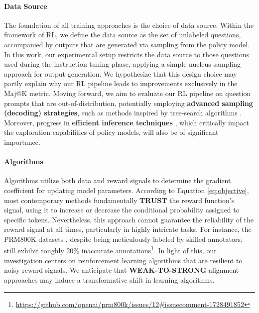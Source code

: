 \begin{itemize}[topsep=0pt]
\paragraph{Data Source} The foundation of all training approaches is the choice of data source. Within the framework of RL, we define the data source as the set of unlabeled questions, accompanied by outputs that are generated via sampling from the policy model. In this work, our experimental setup restricts the data source to those questions used during the instruction tuning phase, applying a simple nucleus sampling approach for output generation. We hypothesize that this design choice may partly explain why our RL pipeline leads to improvements exclusively in the Maj@K metric. Moving forward, we aim to evaluate our RL pipeline on question prompts that are out-of-distribution, potentially employing \textbf{advanced sampling (decoding) strategies}, such as methods inspired by tree-search algorithms \citep{yao2023tree}. Moreover, progress in \textbf{efficient inference techniques} \citep{xia-etal-2023-speculative,leviathan2023fast,kwon2023efficient,xia2024unlocking}, which critically impact the exploration capabilities of policy models, will also be of significant importance.

\paragraph{Algorithms} Algorithms utilize both data and reward signals to determine the gradient coefficient for updating model parameters. According to Equation \ref{eq:objective}, most contemporary methods fundamentally \textbf{TRUST} the reward function's signal, using it to increase or decrease the conditional probability assigned to specific tokens. Nevertheless, this approach cannot guarantee the reliability of the reward signal at all times, particularly in highly intricate tasks. For instance, the PRM800K datasets \citep{lightman2023let}, despite being meticulously labeled by skilled annotators, still exhibit roughly 20\% inaccurate annotations\footnote{\url{https://github.com/openai/prm800k/issues/12\#issuecomment-1728491852}}. In light of this, our investigation centers on reinforcement learning algorithms that are resilient to noisy reward signals. We anticipate that \textbf{WEAK-TO-STRONG} \citep{burns2023weak} alignment approaches may induce a transformative shift in learning algorithms.


\end{itemize}
